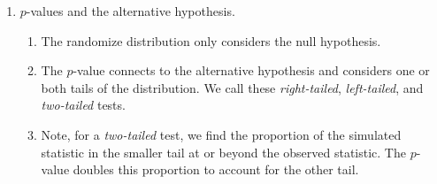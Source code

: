 \documentclass{article}
\begin{document}
\begin{enumerate}
\item $p$-values and the alternative hypothesis.
\begin{enumerate}
\item The randomize distribution only considers the null hypothesis.
\item The $p$-value connects to the alternative hypothesis and considers one or both tails of the distribution. We call these \emph{right-tailed}, \emph{left-tailed}, and \emph{two-tailed} tests.
\item Note, for a \emph{two-tailed} test, we find the proportion of the simulated statistic in the smaller tail at or beyond the observed statistic. The $p$-value doubles this proportion to account for the other tail.
\end{enumerate}

\end{enumerate}

\end{document}
